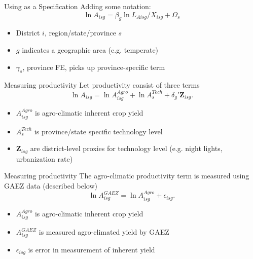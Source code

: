 \documentclass[10pt, xcolor=dvipsnames]{beamer}
\begin{document}
\begin{frame}{Using as a Specification}
Adding some notation:
\begin{equation}
\ln A_{isg} = \beta_g \ln L_{Aisg}/X_{isg} + \Omega_s \label{EQ_model}
\end{equation}

\begin{itemize}
  \item District $i$, region/state/province $s$
  \item $g$ indicates a geographic area (e.g. temperate)
  \item $\gamma_{s}$, province FE, picks up province-specific term
\end{itemize}
\end{frame}

\begin{frame}{Measuring productivity}
Let productivity consist of three terms
\begin{equation}
  \ln A_{isg} = \ln A_{isg}^{Agro} + \ln A_{s}^{Tech} + \delta_g' \mathbf{Z}_{isg}. \label{EQ_prod}
\end{equation}

\begin{itemize}
  \item $A_{isg}^{Agro}$ is agro-climatic inherent crop yield
  \item $A_{s}^{Tech}$ is province/state specific technology level
  \item $\mathbf{Z}_{isg}$ are district-level proxies for technology level (e.g. night lights, urbanization rate)
\end{itemize}
\end{frame}

\begin{frame}{Measuring productivity}
The agro-climatic productivity term is measured using GAEZ data (described below)
\begin{equation}
  \ln A_{isg}^{GAEZ} = \ln A_{isg}^{Agro} + \epsilon_{isg}. \label{EQ_gaez}
\end{equation}

\begin{itemize}
  \item $A_{isg}^{Agro}$ is agro-climatic inherent crop yield
  \item $A_{isg}^{GAEZ}$ is measured agro-climated yield by GAEZ
  \item $\epsilon_{isg}$ is error in measurement of inherent yield
\end{itemize}
\end{frame}
\end{document}
